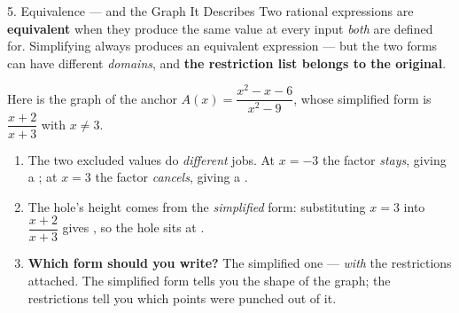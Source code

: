 \documentclass[10pt]{article}
\newcommand{\lgrid}[4]{%
  \draw[step=1, linegray!40, very thin] (#1,#3) grid (#2,#4);
  \draw[->, semithick, charcoal] (#1,0)--(#2,0) node[below right, font=\scriptsize]{$x$};
  \draw[->, semithick, charcoal] (0,#3)--(0,#4) node[left, font=\scriptsize]{$y$};}
\begin{document}
\begin{notesbox}{5. Equivalence --- and the Graph It Describes}
Two rational expressions are \textbf{equivalent} when they produce the same value at every input
\emph{both} are defined for. Simplifying always produces an equivalent expression --- but the two forms
can have different \emph{domains}, and \textbf{the restriction list belongs to the original}.

\vspace{3pt}
Here is the graph of the anchor $A(x)=\dfrac{x^2-x-6}{x^2-9}$, whose simplified form is
$\dfrac{x+2}{x+3}$ with $x\neq3$.
\begin{center}
\end{center}
\begin{enumerate}[leftmargin=1.7em, itemsep=3pt]
  \item The two excluded values do \emph{different} jobs. At $x=-3$ the factor \emph{stays}, giving a
        ; at $x=3$ the factor \emph{cancels}, giving a .
  \item The hole's height comes from the \emph{simplified} form: substituting $x=3$ into
        $\dfrac{x+2}{x+3}$ gives , so the hole sits at .
  \item \textbf{Which form should you write?} The simplified one --- \emph{with} the restrictions
        attached. The simplified form tells you the shape of the graph; the restrictions tell you which
        points were punched out of it.
\end{enumerate}


\end{notesbox}
\end{document}
